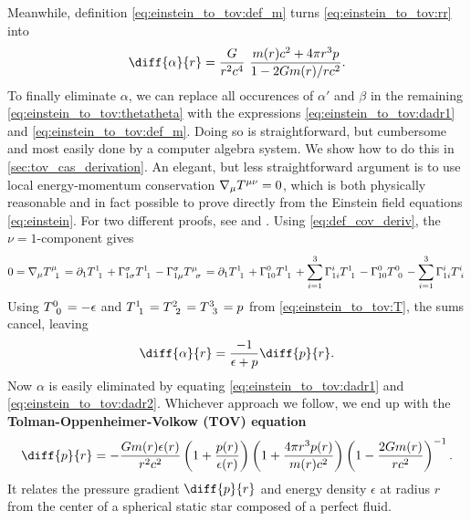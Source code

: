 Meanwhile, definition \eqref{eq:einstein_to_tov:def_m} turns \cref{eq:einstein_to_tov:rr} into
\begin{equation}
	\diff{\alpha}{r} = \frac{G}{r^2 c^4} \frac{m(r) c^2 + 4 \pi r^3 p}{1 - 2 G m(r) / r c^2} .
	\label{eq:einstein_to_tov:dadr1}
\end{equation}
To finally eliminate $\alpha$, we can replace all occurences of $\alpha'$ and $\beta$ in the remaining \cref{eq:einstein_to_tov:thetatheta} with the expressions \eqref{eq:einstein_to_tov:dadr1} and \eqref{eq:einstein_to_tov:def_m}.
Doing so is straightforward, but cumbersome and most easily done by a computer algebra system.
We show how to do this in \cref{sec:tov_cas_derivation}.
An elegant, but less straightforward argument is to use local energy-momentum conservation $\nabla_\mu T\indices{^\mu^\nu} = 0$, which is both physically reasonable and in fact possible to prove directly from the Einstein field equations \eqref{eq:einstein}.
For two different proofs, see \cite{ref:einstein_conservation_energy_momentum} and \cite[section 8.3.2]{ref:mika_gr_notes}.
Using \cref{eq:def_cov_deriv}, the $\nu=1$-component gives
\begin{equation*}
	0
	= \nabla_\mu T\indices{^\mu_1}
	= \partial_1 T\indices{^1_1} + \Gamma^\sigma_{1 \sigma} T\indices{^1_1} - \Gamma^\sigma_{1 \mu} T\indices{^\mu_\sigma}
	= \partial_1 T\indices{^1_1} + \Gamma^0_{10} T\indices{^1_1} + \sum_{i=1}^3 \Gamma^i_{1i} T\indices{^1_1} - \Gamma^0_{10} T\indices{^0_0} - \sum_{i=1}^3 \Gamma^i_{1i} T\indices{^i_i}
\end{equation*}
Using $T\indices{^0_0} = -\epsilon$ and $T\indices{^1_1} = T\indices{^2_2} = T\indices{^3_3} = p$ from \cref{eq:einstein_to_tov:T}, the sums cancel, leaving
\begin{equation}
	\diff{\alpha}{r} = \frac{-1}{\epsilon+p} \diff{p}{r} .
	\label{eq:einstein_to_tov:dadr2}
\end{equation}
Now $\alpha$ is easily eliminated by equating \eqref{eq:einstein_to_tov:dadr1} and \eqref{eq:einstein_to_tov:dadr2}. 
Whichever approach we follow, we end up with the \textbf{Tolman-Oppenheimer-Volkow (TOV) equation}
\begin{equation}
	\diff{p}{r} = -\frac{G m(r) \epsilon(r)}{r^2 c^2} \left( 1 + \frac{p(r)}{\epsilon(r)} \right) \left( 1 + \frac{4 \pi r^3 p(r)}{m(r) c^2} \right) \left( 1 - \frac{2 G m(r)}{r c^2} \right)^{-1} .
	\label{eq:tov}
\end{equation}
It relates the pressure gradient $\diff{p}{r}$ and energy density $\epsilon$ at radius $r$ from the center of a spherical static star composed of a perfect fluid.
